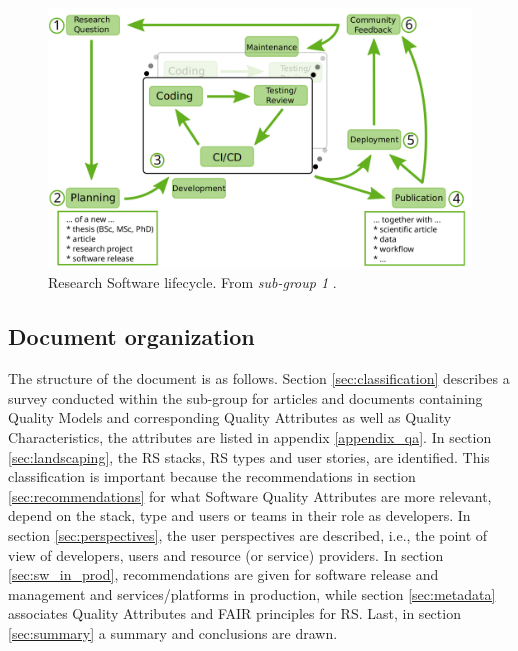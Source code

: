 \begin{figure}[h]
    \centering
    \includegraphics[width=0.90\linewidth]{imgs/rs_lifecycle.png}
    \caption{Research Software lifecycle. From \textit{sub-group 1} \cite{sg1tf2023}.}
    \label{fig:rslifecycle}
\end{figure}

\subsection{Document organization}

The structure of the document is as follows. Section \ref{sec:classification} describes a survey conducted within the sub-group for articles and documents containing Quality Models and corresponding Quality Attributes as well as Quality Characteristics, the attributes are listed in appendix \ref{appendix_qa}. In section \ref{sec:landscaping}, the RS stacks, RS types and user stories, are identified. This classification is important because the recommendations in section \ref{sec:recommendations} for what Software Quality Attributes are more relevant, depend on the stack, type and users or teams in their role as developers. In section \ref{sec:perspectives}, the user perspectives are described, i.e., the point of view of developers, users and resource (or service) providers. In section \ref{sec:sw_in_prod}, recommendations are given for software release and management and services/platforms in production, while section \ref{sec:metadata} associates Quality Attributes and FAIR principles for RS. Last, in section \ref{sec:summary} a summary and conclusions are drawn.
